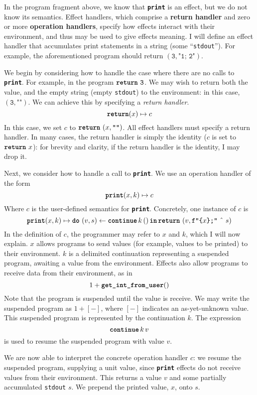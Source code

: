 In the program fragment above, we know that \textbf{\texttt{print}} is an effect, but we do not know its semantics. Effect handlers, which comprise a \textbf{return handler} and zero or more \textbf{operation handlers}, specify how effects interact with their environment, and thus may be used to give effects meaning. I will define an effect handler that accumulates print statements in a string (some ``\texttt{stdout}'').  For example, the aforementioned program should return $(\texttt{3}, \texttt{"1; 2"})$.

We begin by considering how to handle the case where there are no calls to \textbf{\texttt{print}}. For example, in the program $\texttt{\textbf{return}} \,\, {\texttt{3}}$. We may wish to return both the value, and the empty string (empty \texttt{stdout}) to the environment: in this case, $(\texttt{3}, \texttt{""})$. We can achieve this by specifying a \textit{return handler}.
\[\textbf{\texttt{return}}(x) \mapsto {c}\]
In this case, we set $c$ to $\texttt{\textbf{return}} \,\, {(x, \texttt{""})}$. All effect handlers must specify a return handler. In many cases, the return handler is simply the identity ($c$ is set to $\texttt{\textbf{return}} \,\, {x}$): for brevity and clarity, if the return handler is the identity, I may drop it. 

Next, we consider how to handle a call to \textbf{\texttt{print}}. We use an operation handler of the form 
\[\textbf{\texttt{print}}(x, k) \mapsto {c}\]
Where $c$ is the user-defined semantics for \textbf{\texttt{print}}.
Concretely, one instance of $c$ is 
\[\textbf{\texttt{print}}(x, k) \mapsto {\texttt{\textbf{do}} \,\, {(v, s)} \leftarrow {\textbf{\texttt{continue}} \, {k} \, {()}} \, \textbf{\texttt{in}} \, {\texttt{\textbf{return}} \,\, {(v, \texttt{f"\{$x$\};"} \text{ \^\ } s)}}}\]
In the definition of $c$, the programmer may refer to $x$ and $k$, which I will now explain. $x$ allows programs to send values (for example, values to be printed) to their environment. $k$ is a delimited continuation representing a suspended program, awaiting a value from the environment. Effects also allow programs to receive data from their environment, as in
\[1 + \textbf{\texttt{get\_int\_from\_user}}()\]
Note that the program is suspended until the value is receive. We may write the suspended program as $1 + [-]$, where $[-]$ indicates an as-yet-unknown value. This suspended program is represented by the continuation $k$. The expression 
\[\textbf{\texttt{continue}} \, {k} \, {v}\] 
is used to resume the suspended program with value $v$. 

We are now able to interpret the concrete operation handler $c$: we resume the suspended program, supplying a unit value, since \textbf{\texttt{print}} effects do not receive values from their environment. This returns a value $v$ and some partially accumulated \texttt{stdout} $s$. We prepend the printed value, $x$, onto $s$. 

